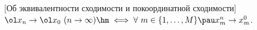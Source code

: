[Об эквивалентности сходимости и покоординатной сходимости]
	 $\ol x_n \to \ol x_0\ (n \to \infty)\hm\iff \forall\ m \in \{1, \ldots, M\}\pau x_m^n \to x_m^0$.
	 